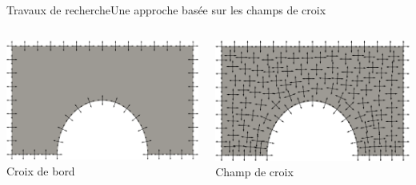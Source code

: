 \documentclass[compress,10pt,aspectratio=169]{beamer}
\begin{document}
\begin{frame}{Travaux de recherche}{Une approche basée sur les champs de croix}
\small
\vspace{-0.2cm}
\begin{columns}
\begin{column}{0.25\textwidth}
\centering
\includegraphics[scale=0.068]{images/frey_1.pdf}\hspace{0.2cm}
\footnotesize Croix de bord
\end{column}

\begin{column}{0.25\textwidth}
\centering
\includegraphics[scale=0.068]{images/frey_4.pdf}\hspace{0.2cm}
\footnotesize Champ de croix
\end{column}


\end{columns}
\end{frame}
\end{document}
